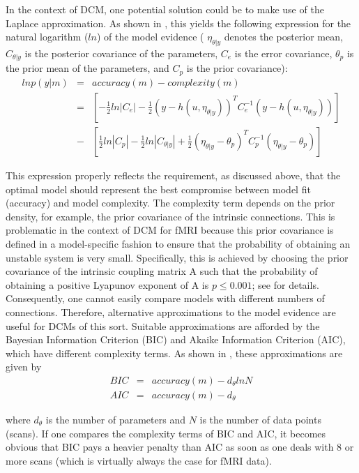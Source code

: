 In the context of DCM, one potential solution could be to make use of the Laplace approximation.  As shown in \cite{cdcm}, this yields the following expression for the natural logarithm ($ln$) of the model evidence ( $\eta_{\theta | y}$ denotes the posterior mean, $C_{\theta | y}$ is the posterior covariance of the parameters, $C_e$  is the error covariance, $\theta_p$ is the prior mean of the parameters, and $C_p$ is the prior covariance):
\begin{eqnarray}
ln p(y|m) & = & accuracy(m) - complexity (m) \\ \nonumber
& = & \left[ -\frac{1}{2} ln |C_e| - \frac{1}{2} (y-h(u,\eta_{\theta | y}))^T C_e^{-1} (y-h(u,\eta_{\theta | y}))\right] \\ \nonumber
& - & \left[ \frac{1}{2} ln |C_p| -\frac{1}{2}ln |C_{\theta | y}| + \frac{1}{2} (\eta_{\theta | y}-\theta_p)^T C_p^{-1} (\eta_{\theta | y}-\theta_p) \right]
\end{eqnarray} 

This expression properly reflects the requirement, as discussed above, that the optimal model should represent the best compromise between model fit (accuracy) and model complexity.  The complexity term depends on the prior density, for example, the prior covariance of the intrinsic connections.  This is problematic in the context of DCM for fMRI because this prior covariance is defined in a model-specific fashion to ensure that the probability of obtaining an unstable system is very small.  Specifically, this is achieved by choosing the prior covariance of the intrinsic coupling matrix A such that the probability of obtaining a positive Lyapunov exponent of A is $p \leq 0.001$; see \cite{dcm} for details. Consequently, one cannot easily compare models with different numbers of connections. Therefore, alternative approximations to the model evidence are useful for DCMs of this sort.
Suitable approximations are afforded by the Bayesian Information Criterion (BIC) and Akaike Information Criterion (AIC), which have different complexity terms. As shown in \cite{cdcm}, these approximations are given by
\begin{eqnarray}
BIC & = & accuracy(m) - d_{\theta} ln N \\ \nonumber
AIC & = & accuracy(m) - d_{\theta}
\end{eqnarray}

where $d_{\theta}$ is the number of parameters and $N$ is the number of data points (scans).  If one compares the complexity terms of BIC and AIC, it becomes obvious that BIC pays a heavier penalty than AIC as soon as one deals with 8 or more scans (which is virtually always the case for fMRI data).

